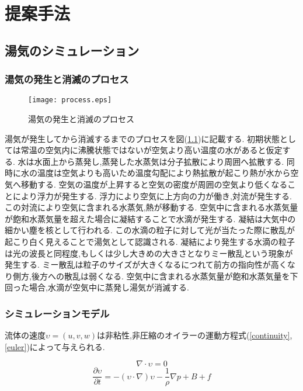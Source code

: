 \chapter{提案手法}
\section{湯気のシミュレーション}

\subsection{湯気の発生と消滅のプロセス}
\begin{figure}[h]
\centering
\texttt{[image: process.eps]}
\caption{湯気の発生と消滅のプロセス}
\label{process}
\end{figure}
湯気が発生してから消滅するまでのプロセスを図(\ref{process})に記載する.	
初期状態としては常温の空気内に沸騰状態ではないが空気より高い温度の水があると仮定する.
水は水面上から蒸発し,蒸発した水蒸気は分子拡散により周囲へ拡散する.
同時に水の温度は空気よりも高いため温度勾配により熱拡散が起こり熱が水から空気へ移動する.
空気の温度が上昇すると空気の密度が周囲の空気より低くなることにより浮力が発生する.
浮力により空気に上方向の力が働き,対流が発生する.
この対流により空気に含まれる水蒸気,熱が移動する.
空気中に含まれる水蒸気量が飽和水蒸気量を超えた場合に凝結することで水滴が発生する.
凝結は大気中の細かい塵を核として行われる.
この水滴の粒子に対して光が当たった際に散乱が起こり白く見えることで湯気として認識される.
凝結により発生する水滴の粒子は光の波長と同程度,もしくは少し大きめの大きさとなりミー散乱という現象が発生する.
ミー散乱は粒子のサイズが大きくなるにつれて前方の指向性が高くなり側方,後方への散乱は弱くなる.
空気中に含まれる水蒸気量が飽和水蒸気量を下回った場合,水滴が空気中に蒸発し湯気が消滅する.

\subsection{シミュレーションモデル}

流体の速度$\upsilon=(u,v,w)$は非粘性,非圧縮のオイラーの運動方程式(\ref{continuity},\ref{euler})によって与えられる.

\begin{equation}
\label{continuity}
\nabla \cdot \upsilon = 0
\end{equation}
\begin{equation}
\label{euler}
\frac{\partial \upsilon}{\partial t} = -(\upsilon \cdot \nabla)\upsilon - \frac{1}{\rho} \nabla p + B + f
\end{equation}

